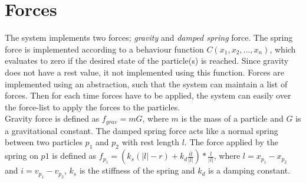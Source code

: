 \section{Forces}
The system implements two forces; \emph{gravity} and \emph{damped spring} force. The spring force is implemented according to a behaviour function $C(x_1, x_2, ..., x_n)$, which evaluates to zero if the desired state of the particle(s) is reached. Since gravity does not have a rest value, it not implemented using this function. Forces are implemented using an abstraction, such that the system can maintain a list of forces. Then for each time forces have to be applied, the system can easily over the force-list to apply the forces to the particles.\\
Gravity force is defined as $f_{grav} = mG$, where $m$ is the mass of a particle and $G$ is a gravitational constant. The damped spring force acts like a normal spring between two particles $p_1$ and $p_2$ with rest length $l$. The force applied by the spring on $p1$ is defined as $f_{p_1} = (k_s (|l| - r) + k_d \frac{i \dot l}{|l|}) * \frac{l}{|l|}$, where $l = x_{p_1} - x_{p_2}$ and $i = v_{p_1} - v_{p_2}$, $k_s$ is the stiffness of the spring and $k_d$ is a damping constant. 